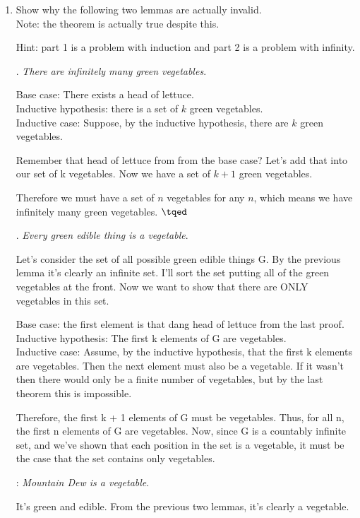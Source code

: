 \documentclass[basic, header]{nosvagor-notes}
\begin{document}
\begin{enumerate}[itemsep=4em]
\begin{enumerate}[leftmargin=2em]
    \end{enumerate}

  \newpage %

  \item Show why the following two lemmas are actually invalid.\\

    Note: the theorem is actually true despite this.

    Hint: part 1 is a problem with induction and part 2 is a problem with
    infinity.

    . \textit{There are infinitely many green vegetables}.


    Base case: There exists a head of lettuce.\\
    Inductive hypothesis: there is a set of \(k\) green vegetables.\\
    Inductive case: Suppose, by the inductive hypothesis, there are \(k\) green vegetables.

    Remember that head of lettuce from from the base case? Let’s add that into our set of k vegetables.
    Now we have a set of \(k + 1\) green vegetables.

    Therefore we must have a set of \(n\) vegetables for any \(n\), which means
    we have infinitely many green vegetables. \(\tqed\)

    . \textit{Every green edible thing is a vegetable}.


    Let’s consider the set of all possible green edible things G. By the
    previous lemma it’s clearly an infinite set. I’ll sort the set putting all
    of the green vegetables at the front. Now we want to show that there are
    ONLY vegetables in this set.

    Base case: the first element is that dang head of lettuce from the last
    proof.\\ Inductive hypothesis: The first k elements of G are vegetables.\\
    Inductive case: Assume, by the inductive hypothesis, that the first k
    elements are vegetables. Then the next element must also be a vegetable. If
    it wasn't then there would only be a finite number of vegetables, but by
    the last theorem this is impossible.

    Therefore, the first k + 1 elements of G must be vegetables. Thus, for all
    n, the first n elements of G are vegetables. Now, since G is a countably
    infinite set, and we've shown that each position in the set is a vegetable,
    it must be the case that the set contains only vegetables.

    : \textit{Mountain Dew is a vegetable}.


    It’s green and edible. From the previous two lemmas, it’s clearly a vegetable. \tqed

\end{enumerate}
\end{document}

